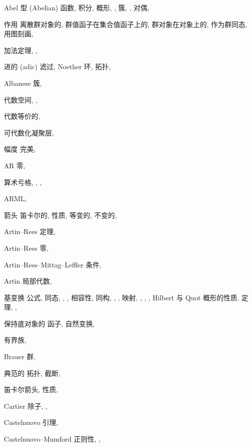 \begin{theindex}
\item Abel 型 (Abelian)
\subitem 函数, 
\subitem 积分, 
\subitem 概形, , 
\subitem 簇, , 
\subsubitem 对偶, 
\item 作用
\subitem 离散群对象的, 
\subitem 群值函子在集合值函子上的, 
\subitem 群对象在对象上的, 
\subsubitem 作为群同态, 
\subsubitem 用图刻画, 
\item 加法定理, , 
\item 进的 (adic)
\subitem 滤过, 
\subitem Noether 环, 
\subitem 拓扑, 
\item Albanese 簇, 
\item 代数空间, , 
\item 代数等价的, 
\item 可代数化凝聚层, 
\item 幅度
\subitem 完美, 
\item AR 零, 
\item 算术亏格, , , 
\item ARML, 
\item 箭头
\subitem 笛卡尔的, 
\subsubitem 性质, 
\subitem 等变的, 
\subitem 不变的, 
\item Artin--Rees 定理, 
\item Artin--Rees 零, 
\item Artin--Rees--Mittag--Leffler 条件, 
\item Artin 局部代数, 
\indexspace
\item 基变换
\subitem 公式, 
\subitem 同态, , , 
\subsubitem 相容性, 
\subitem 同构, , , 
\subitem 映射, , , , 
\subitem Hilbert 与 Quot 概形的性质, 
\subitem 定理, , 
\item 保持底对象的
\subitem 函子, 
\subitem 自然变换, 
\item 有界族, 
\item Brauer 群, 
\indexspace
\item 典范的
\subitem 拓扑, 
\subitem 截断, 
\item 笛卡尔箭头, 
\subitem 性质, 
\item Cartier 除子, , 
\item Castelnuovo 引理, 
\item Castelnuovo--Mumford 正则性, , 


\end{theindex}
